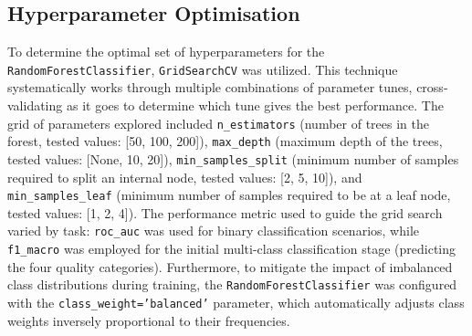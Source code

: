 \subsection{Hyperparameter Optimisation}
\label{ssec:hyperparameter_optimisation} %
To determine the optimal set of hyperparameters for the \texttt{RandomForestClassifier}, \texttt{GridSearchCV} was utilized. This technique systematically works through multiple combinations of parameter tunes, cross-validating as it goes to determine which tune gives the best performance. The grid of parameters explored included \texttt{n\_estimators} (number of trees in the forest, tested values: [50, 100, 200]), \texttt{max\_depth} (maximum depth of the trees, tested values: [None, 10, 20]), \texttt{min\_samples\_split} (minimum number of samples required to split an internal node, tested values: [2, 5, 10]), and \texttt{min\_samples\_leaf} (minimum number of samples required to be at a leaf node, tested values: [1, 2, 4]).
The performance metric used to guide the grid search varied by task: \texttt{roc\_auc} was used for binary classification scenarios, while \texttt{f1\_macro} was employed for the initial multi-class classification stage (predicting the four quality categories). Furthermore, to mitigate the impact of imbalanced class distributions during training, the \texttt{RandomForestClassifier} was configured with the \texttt{class\_weight='balanced'} parameter, which automatically adjusts class weights inversely proportional to their frequencies.
